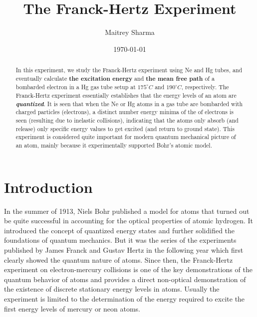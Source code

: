 \documentclass[%
 reprint,
 amsmath,amssymb,
 aps,
]{revtex4-2}
\begin{document}

\title{The Franck-Hertz Experiment}%


\author{Maitrey Sharma}




\date{\today}%

\begin{abstract}
In this experiment, we study the Franck-Hertz experiment using Ne and Hg tubes, and eventually calculate \textbf{the excitation energy} and \textbf{the mean free path} of a bombarded electron in a Hg gas tube setup at $175 ^{\circ} C$ and $190 ^{\circ} C$, respectively. The Franck-Hertz experiment essentially establishes that the energy levels of an atom are \textit{\textbf{quantized}}. It is seen that when the Ne or Hg atoms in a gas tube are bombarded with charged particles (electrons), a distinct number energy minima of the of electrons is seen (resulting due to inelastic collisions), indicating that the atoms only absorb (and release) only specific energy values to get excited (and return to ground state). This experiment is considered quite important for modern quantum mechanical picture of an atom, mainly because it experimentally supported Bohr's atomic model.
\end{abstract}

\maketitle


\section{\label{sec:level1}Introduction}
    In the summer of 1913, Niels Bohr published a model for atoms that turned out be quite successful in accounting for the optical properties of atomic hydrogen. It introduced the concept of quantized energy states and further solidified the foundations of quantum mechanics. But it was the series of the experiments published by James Franck and Gustav Hertz in the following year which first clearly showed the quantum nature of atoms. Since then, the Franck-Hertz experiment on electron-mercury collisions is one of the key demonstrations of the quantum behavior of atoms and provides a direct non-optical demonstration of the existence of discrete stationary energy levels in atoms. Usually the experiment is limited to the determination of the energy required to excite the first energy levels of mercury or neon atoms.
    \par
    
\end{document}
